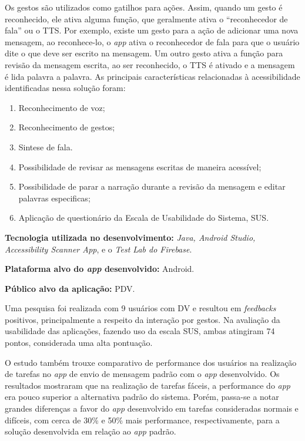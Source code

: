 Os gestos são utilizados como gatilhos para ações.
Assim, quando um gesto é reconhecido, ele ativa alguma função, que geralmente ativa o ``reconhecedor de fala'' ou o TTS\@.
Por exemplo, existe um gesto para a ação de adicionar uma nova mensagem, ao reconhece-lo, o \emph{app} ativa o reconhecedor de fala para que o usuário dite o que deve ser escrito na mensagem.
Um outro gesto ativa a função para revisão da mensagem escrita, ao ser reconhecido, o TTS é ativado e a mensagem é lida palavra a palavra.
As principais características relacionadas à acessibilidade identificadas nessa solução foram:

\begin{enumerate}
    \item Reconhecimento de voz;
    \item Reconhecimento de gestos;
    \item Sintese de fala.
    \item Possibilidade de revisar as mensagens escritas de maneira acessível;
    \item Possibilidade de parar a narração durante a revisão da mensagem e editar palavras especificas;
    \item Aplicação de questionário da Escala de Usabilidade do Sistema, SUS\@.
\end{enumerate}

\textbf{Tecnologia utilizada no desenvolvimento:} \emph{Java, Android Studio, Accessibility Scanner App}, e o \emph{Test Lab do Firebase}.

\textbf{Plataforma alvo do \emph{app} desenvolvido:} Android.

\textbf{Público alvo da aplicação:} PDV\@.

Uma pesquisa foi realizada com 9 usuários com DV e resultou em \emph{feedbacks} positivos, principalmente a respeito da interação por gestos.
Na avaliação da usabilidade das aplicações, fazendo uso da escala SUS, ambas atingiram 74 pontos, considerada uma alta pontuação.

O estudo também trouxe comparativo de performance dos usuários na realização de tarefas no \emph{app} de envio de mensagem padrão com o \emph{app} desenvolvido.
Os resultados mostraram que na realização de tarefas fáceis, a performance do \emph{app} era pouco superior a alternativa padrão do sistema.
Porém, passa-se a notar grandes diferenças a favor do \emph{app} desenvolvido em tarefas consideradas normais e difíceis, com cerca de 30\% e 50\% mais performance, respectivamente, para a solução desenvolvida em relação ao \emph{app} padrão.

